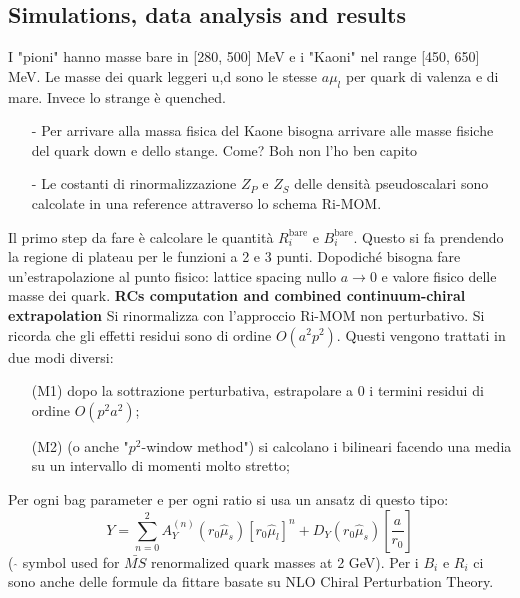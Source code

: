 \documentclass[12pt,a4paper,openright]{article}
\newcommand{\bare}{^{\text{bare}}}
\begin{document}
\subsection{Simulations, data analysis and results}
I "pioni" hanno masse bare in [280, 500] MeV e i "Kaoni" nel range [450, 650] MeV.
Le masse dei quark leggeri u,d sono le stesse $a\mu_l$ per quark di valenza e di mare. Invece lo strange è quenched.
\begin{itemize}
  \item [-] Per arrivare alla massa fisica del Kaone bisogna arrivare alle masse fisiche del quark down e dello stange. Come? Boh non l'ho ben capito
  \item [-] Le costanti di rinormalizzazione $Z_P$ e $Z_S$ delle densità pseudoscalari sono calcolate in una reference attraverso lo schema Ri-MOM.
\end{itemize}
Il primo step da fare è calcolare le quantità $R_i\bare$ e $B_i\bare$.
Questo si fa prendendo la regione di plateau per le funzioni a 2 e 3 punti.
Dopodiché bisogna fare un'estrapolazione al punto fisico: lattice spacing nullo $a\rightarrow 0$ e valore fisico delle masse dei quark.
\newline
\newline
{\bf RCs computation and combined continuum-chiral extrapolation}
Si rinormalizza con l'approccio Ri-MOM non perturbativo. Si ricorda che gli effetti residui sono di ordine $O(a^2p^2)$.
Questi vengono trattati in due modi diversi:
\begin{enumerate}
  \item [(M1)] dopo la sottrazione perturbativa, estrapolare a 0 i termini residui di ordine $O(p^2a^2)$;
  \item [(M2)] (o anche "$p^2$-window method") si calcolano i bilineari facendo una media su un intervallo di momenti molto stretto;
\end{enumerate}
Per ogni bag parameter e per ogni ratio si usa un ansatz di questo tipo:
\begin{equation*}
  Y = \sum_{n=0}^2 A_Y^{(n)} (r_0\hat\mu_s) [r_0 \hat\mu_l]^n + D_Y (r_0\hat\mu_s) \left[\frac{a}{r_0}\right]
\end{equation*}
( $\hat{}$ symbol used for $\bar{MS}$ renormalized quark masses at 2 GeV).
Per i $B_i$ e $R_i$ ci sono anche delle formule da fittare basate su NLO Chiral Perturbation Theory.
\end{document}
